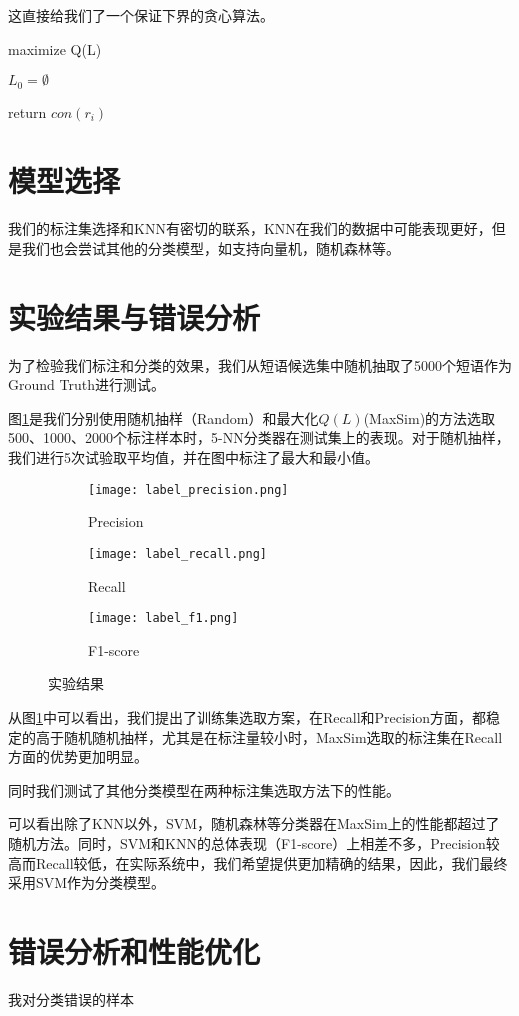 这直接给我们了一个保证下界的贪心算法。
\begin{algorithm}
  \caption{maximize Q(L)}
  $L_0 = \emptyset$\;
  {

  }
  return $con(r_i)$\;
\end{algorithm}

\section{模型选择}
我们的标注集选择和KNN有密切的联系，KNN在我们的数据中可能表现更好，但是我们也会尝试其他的分类模型，如支持向量机，随机森林等。

\section{实验结果与错误分析}
为了检验我们标注和分类的效果，我们从短语候选集中随机抽取了5000个短语作为Ground Truth进行测试。

图\ref{fig:testing_vs_random}是我们分别使用随机抽样（Random）和最大化$Q(L)$(MaxSim)的方法选取500、1000、2000个标注样本时，5-NN分类器在测试集上的表现。对于随机抽样，我们进行5次试验取平均值，并在图中标注了最大和最小值。

\begin{figure}[h!]
  \centering
  \begin{subfigure}{0.4\textwidth}
    \texttt{[image: label\_precision.png]}
    \caption{Precision}
  \end{subfigure}
  \hspace{2em}%
  \begin{subfigure}{0.4\textwidth}
    \texttt{[image: label\_recall.png]}
    \caption{Recall}
  \end{subfigure}
  \hspace{2em}
  \begin{subfigure}{0.4\textwidth}
  	\texttt{[image: label\_f1.png]}
  	\caption{F1-score}
  \end{subfigure}
  \caption{实验结果}
  \label{fig:testing_vs_random}
\end{figure}
从图\ref{fig:testing_vs_random}中可以看出，我们提出了训练集选取方案，在Recall和Precision方面，都稳定的高于随机随机抽样，尤其是在标注量较小时，MaxSim选取的标注集在Recall方面的优势更加明显。

同时我们测试了其他分类模型在两种标注集选取方法下的性能。

可以看出除了KNN以外，SVM，随机森林等分类器在MaxSim上的性能都超过了随机方法。同时，SVM和KNN的总体表现（F1-score）上相差不多，Precision较高而Recall较低，在实际系统中，我们希望提供更加精确的结果，因此，我们最终采用SVM作为分类模型。

\section{错误分析和性能优化}
我对分类错误的样本


